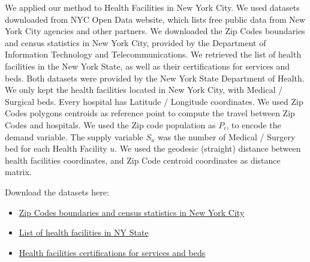 We applied our method to Health Facilities in New York City. We used datasets downloaded from NYC Open Data website, which lists free public data from New York City agencies and other partners. We downloaded the Zip Codes boundaries and census statistics in New York City, provided by the Department of Information Technology and Telecommunications. We retrieved the list of health facilities in the New York State, as well as their certifications for services and beds. Both datasets were provided by the New York State Department of Health. We only kept the health facilities located in New York City, with Medical / Surgical beds. Every hospital has Latitude / Longitude coordinates. We used Zip Codes polygons centroids as reference point to compute the travel between Zip Codes and hospitals. We used the Zip code population as $P_i$, to encode the demand variable. The supply variable $S_u$ was the number of Medical / Surgery bed for each Health Facility $u$. We used the geodesic (straight) distance between health facilities coordinates, and Zip Code centroid coordinates as distance matrix.

Download the datasets here:

\begin{itemize}
    \item \href{https://data.beta.nyc/dataset/nyc-zip-code-tabulation-areas/resource/894e9162-871c-4552-a09c-c6915d8783fb}{Zip Codes boundaries and census statistics in New York City}
    \item \href{https://health.data.ny.gov/Health/Health-Facility-General-Information/vn5v-hh5r}{List of health facilities in NY State}
    \item \href{https://health.data.ny.gov/Health/Health-Facility-Certification-Information/2g9y-7kqm}{Health facilities certifications for services and beds}
\end{itemize}

